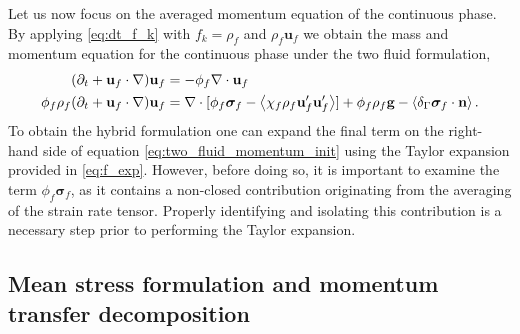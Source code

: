 Let us now focus on the averaged momentum equation of the continuous phase. 
By applying \eqref{eq:dt_f_k} with $f_k = \rho_f$ and $\rho_f\textbf{u}_f$ we obtain the mass and momentum equation for the continuous phase under the two fluid formulation, 
\begin{align}
    (\pddt + \textbf{u}_f\cdot \grad)\textbf{u}_f&=-\phi_f \div \textbf{u}_f\\
    \phi_f \rho_f(\pddt + \textbf{u}_f  \cdot \grad) \textbf{u}_f
    &= 
    \div [\phi_f \bm\sigma_f-  \avg{\chi_f\rho_f \textbf{u}_f'\textbf{u}_f'}]
    + \phi_f \rho_f \textbf{g}
    - \avg{\delta_\Gamma \bm\sigma_f\cdot \textbf{n}}.
    \label{eq:two_fluid_momentum_init}
\end{align} 
To obtain the hybrid formulation one can expand the final term on the right-hand side of equation \ref{eq:two_fluid_momentum_init} using the Taylor expansion provided in \ref{eq:f_exp}.  
However, before doing so, it is important to examine the term \( \phi_f \bm\sigma_f \), as it contains a non-closed contribution originating from the averaging of the strain rate tensor. %
Properly identifying and isolating this contribution is a necessary step prior to performing the Taylor expansion.


\subsection{Mean stress formulation and momentum transfer decomposition}

